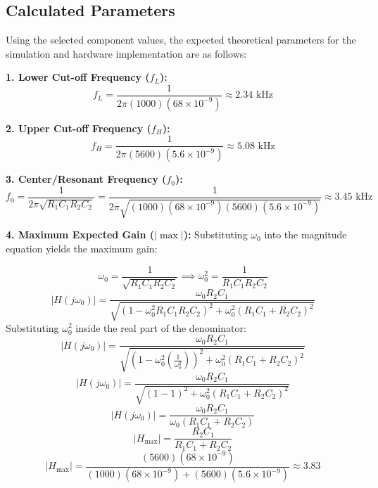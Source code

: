\documentclass[12pt]{article}
\begin{document}
\subsection*{Calculated Parameters}
Using the selected component values, the expected theoretical parameters for the simulation and hardware implementation are as follows:

\textbf{1. Lower Cut-off Frequency ($f_L$):}
\begin{equation}
    f_L = \frac{1}{2\pi (1000)(68 \times 10^{-9})} \approx 2.34 \text{ kHz}
\end{equation}

\textbf{2. Upper Cut-off Frequency ($f_H$):}
\begin{equation}
    f_H = \frac{1}{2\pi (5600)(5.6 \times 10^{-9})} \approx 5.08 \text{ kHz}
\end{equation}

\textbf{3. Center/Resonant Frequency ($f_0$):}
\begin{equation}
    f_0 = \frac{1}{2\pi \sqrt{R_1C_1 R_2C_2}} = \frac{1}{2\pi\sqrt{ (1000)(68 \times 10^{-9})(5600)(5.6 \times 10^{-9})}} \approx 3.45 \text{ kHz}
\end{equation}

\textbf{4. Maximum Expected Gain ($|{\max}|$):}
Substituting $\omega_0$ into the magnitude equation yields the maximum gain:

\[
\omega_0=\frac{1}{\sqrt{R_1C_1R_2C_2}} \implies \omega_0^2=\frac{1}{R_1C_1R_2C_2}
\]
\[
|H(j\omega_0)|=\frac{\omega_0 R_2C_1}
{\sqrt{\left(1-\omega_0^2R_1C_1R_2C_2\right)^2+\omega_0^2\left(R_1C_1+R_2C_2\right)^2}}
\]
Substituting $\omega_0^2$ inside the real part of the denominator:
\[
|H(j\omega_0)|=
\frac{\omega_0 R_2C_1}
{\sqrt{
\left(1-\omega_0^2\left(\frac{1}{\omega_0^2}\right)\right)^2
+
\omega_0^2(R_1C_1+R_2C_2)^2
}}
\]
\[
|H(j\omega_0)|=
\frac{\omega_0 R_2C_1}
{\sqrt{
(1-1)^2
+
\omega_0^2(R_1C_1+R_2C_2)^2
}}
\]
\[
|H(j\omega_0)|=
\frac{\omega_0 R_2C_1}
{\omega_0(R_1C_1+R_2C_2)}
\]
\begin{equation}
    |H_{\max}| = \frac{R_2C_1}{R_1C_1 + R_2C_2}
\end{equation}
\begin{equation}
    |H_{\max}| = \frac{(5600)(68 \times 10^{-9})}{(1000)(68 \times 10^{-9}) + (5600)(5.6 \times 10^{-9})} \approx 3.83
\end{equation}
\end{document}
